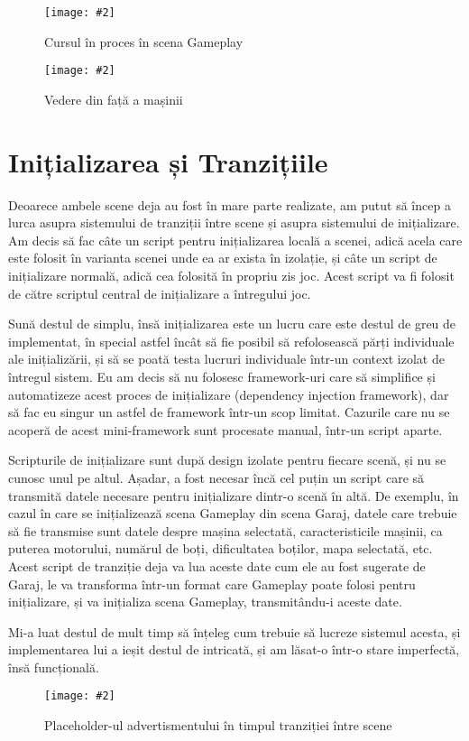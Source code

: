 \documentclass[a4paper,12pt]{report}
\newcommand{\centeredImageWithCaption}[2]{%
  \begin{figure}[H]
    \caption{#1}
    \texttt{[image: \#2]}
    \centering
  \end{figure}}
\begin{document}
\centeredImageWithCaption{Cursul în proces în scena Gameplay}{back_view.png}

\centeredImageWithCaption{Vedere din față a mașinii}{front_view.png}


\section{Inițializarea și Tranzițiile}

Deoarece ambele scene deja au fost în mare parte realizate, am putut să încep a lurca asupra sistemului de tranziții între scene și asupra sistemului de inițializare.
Am decis să fac câte un script pentru inițializarea locală a scenei, adică acela care este folosit în varianta scenei unde ea ar exista în izolație,
și câte un script de inițializare normală, adică cea folosită în propriu zis joc.
Acest script va fi folosit de către scriptul central de inițializare a întregului joc.

Sună destul de simplu, însă inițializarea este un lucru care este destul de greu de implementat,
în special astfel încât să fie posibil să refolosească părți individuale ale inițializării,
și să se poată testa lucruri individuale într-un context izolat de întregul sistem.
Eu am decis să nu folosesc framework-uri care să simplifice și automatizeze acest proces de inițializare (dependency injection framework),
dar să fac eu singur un astfel de framework într-un scop limitat.
Cazurile care nu se acoperă de acest mini-framework sunt procesate manual, într-un script aparte.

Scripturile de inițializare sunt după design izolate pentru fiecare scenă, și nu se cunosc unul pe altul.
Așadar, a fost necesar încă cel puțin un script care să transmită datele necesare pentru inițializare dintr-o scenă în altă.
De exemplu, în cazul în care se inițializează scena Gameplay din scena Garaj, datele care trebuie să fie transmise sunt datele despre mașina selectată, caracteristicile mașinii, ca puterea motorului, numărul de boți, dificultatea boților, mapa selectată, etc.
Acest script de tranziție deja va lua aceste date cum ele au fost sugerate de Garaj, le va transforma într-un format care Gameplay poate folosi pentru inițializare, și va inițializa scena Gameplay, transmitându-i aceste date.

Mi-a luat destul de mult timp să înțeleg cum trebuie să lucreze sistemul acesta, și implementarea lui a ieșit destul de intricată, și am lăsat-o într-o stare imperfectă, însă funcțională.

\centeredImageWithCaption{Placeholder-ul advertismentului în timpul tranziției între scene}{ad.png}
\end{document}
